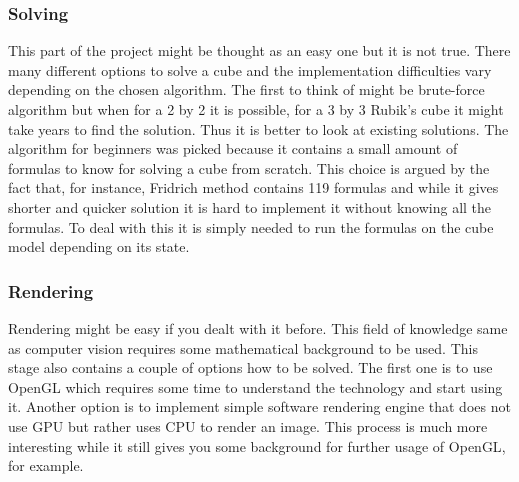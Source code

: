 \documentclass[../../main.tex]{subfiles}
\begin{document}
\subsubsection*{Solving}

This part of the project might be thought as an easy one but it is not true. There many different options to solve a cube and the implementation difficulties vary depending on the chosen algorithm. The first to think of might be brute-force algorithm but when for a 2 by 2 it is possible, for a 3 by 3 Rubik's cube it might take years to find the solution. Thus it is better to look at existing solutions. The algorithm for beginners was picked because it contains a small amount of formulas to know for solving a cube from scratch. This choice is argued by the fact that, for instance, Fridrich method contains 119 formulas and while it gives shorter and quicker solution it is hard to implement it without knowing all the formulas. To deal with this it is simply needed to run the formulas on the cube model depending on its state.

\subsubsection*{Rendering}
\label{subsec:rendering}

Rendering might be easy if you dealt with it before. This field of knowledge same as computer vision requires some mathematical background to be used. This stage also contains a couple of options how to be solved. The first one is to use OpenGL which requires some time to understand the technology and start using it. Another option is to implement simple software rendering engine that does not use \ac{GPU} but rather uses \ac{CPU} to render an image. This process is much more interesting while it still gives you some background for further usage of \ac{OpenGL}, for example.
\end{document}
